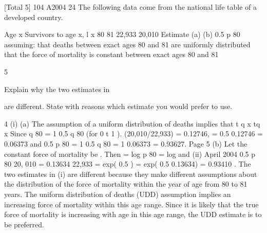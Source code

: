 \documentclass[a4paper,12pt]{article}
\begin{document}
[Total 5]
104 A2004
24
The following data come from the national life table of a developed country.
\item 
Age x Survivors to age x, l x
80
81 22,933
20,010
Estimate
(a)
(b)
0.5 p 80
assuming:
that deaths between exact ages 80 and 81 are uniformly distributed
that the force of mortality is constant between exact ages 80 and 81

5
\item  Explain why the two estimates in \item  are different. State with reasons which
estimate you would prefer to use.


4
(i)
(a)
The assumption of a uniform distribution of deaths implies that
t q x
tq x
Since q 80 = 1
0.5 q 80
(for 0 t 1 ).
(20,010/22,933) = 0.12746,
= 0.5 0.12746 = 0.06373
and 0.5 p 80 = 1
0.5 q 80
= 1 0.06373 = 0.93627.
Page 5 %
(b)
Let the constant force of mortality be . Then
= log p 80 = log
and
(ii)
April 2004
0.5 p 80
20, 010
= 0.13634
22,933
= exp( 0.5 ) = exp( 0.5 0.13634) = 0.93410 .
The two estimates in (i) are different because they make different assumptions
about the distribution of the force of mortality within the year of age from 80
to 81 years.
The uniform distribution of deaths (UDD) assumption implies an increasing
force of mortality within this age range.
Since it is likely that the true force of mortality is increasing with age in this
age range, the UDD estimate is to be preferred.
\end{document}
